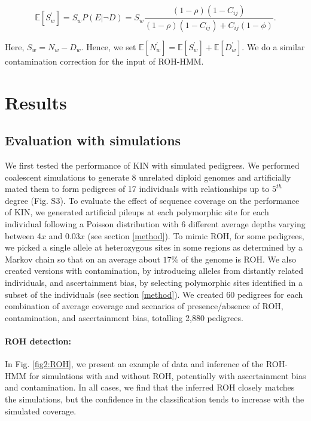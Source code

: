 \documentclass[12pt, letterpaper]{article}
\begin{document}
 \begin{equation}
\mathbb{E}[S_w^{'}] = S_{w} P(E| \neg D) = S_{w} \frac{(1-\rho)(1-C_{ij})}{(1-\rho)(1-C_{ij}) + C_{ij}(1-\phi)}.
 \end{equation}

Here, $S_w = N_w - D_w$. Hence, we set $\mathbb{E}[N_w^{'}] = \mathbb{E}[S_w^{'}] + \mathbb{E}[D_w^{'}]$. We do a similar contamination correction for the input of ROH-HMM.




\section{Results}\label{results}

\subsection{Evaluation with simulations}
We first tested the performance of KIN with simulated pedigrees. We performed coalescent simulations to generate 8 unrelated diploid genomes and artificially mated them to form pedigrees of 17 individuals with relationships up to $5^{th}$ degree (Fig. S3). To evaluate the effect of sequence coverage on the performance of KIN, we generated artificial pileups at each polymorphic site for each individual following a Poisson distribution with 6 different average depths varying between 4$x$ and 0.03$x$ (see section \ref{method}). To mimic ROH, for some pedigrees, we picked a single allele at heterozygous sites in some regions as determined by a Markov chain so that on an average about $17\%$ of the genome is ROH. We also created versions with contamination, by introducing alleles from distantly related individuals, and ascertainment bias, by selecting polymorphic sites identified in a subset of the individuals (see section \ref{method}). We created 60 pedigrees for each combination of average coverage and scenarios of presence/absence of ROH, contamination, and ascertainment bias, totalling 2,880 pedigrees.

\paragraph{ROH detection:}
In Fig. \ref{fig2:ROH}, we present an example of data and inference of the ROH-HMM for simulations with and without ROH, potentially with ascertainment bias and contamination. In all cases, we find that the inferred ROH closely matches the simulations, but the confidence in the classification tends to increase with the simulated coverage.
\end{document}
